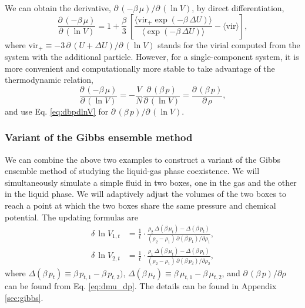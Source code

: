 \documentclass[reprint]{revtex4-1}
\begin{document}
We can obtain the derivative,
$\partial \, (-\beta \, \mu) / \partial \, (\ln V)$,
by direct differentiation,
%
\begin{equation*}
  \frac{ \partial \, (-\beta \, \mu) }
       { \partial \, (\ln V) }
  =
  1 +
  \frac{\beta } { 3 } \,
  \left[
    \frac{ \langle \mathrm{vir}_+ \exp(-\beta \, \Delta U) \rangle }
         { \langle \exp(-\beta \, \Delta U) \rangle }
    -
    \langle \mathrm{vir} \rangle
  \right]
  ,
\end{equation*}
%
where $\mathrm{vir}_+ \equiv -3 \, \partial \, (U + \Delta U) / \partial \, (\ln V)$
stands for the virial
computed from the system with the additional particle.
%
However, for a single-component system,
it is more convenient and computationally more stable
to take advantage of the thermodynamic relation,
\begin{equation}
  \frac{ \partial \, (-\beta \, \mu) }
       { \partial \, (\ln V) }
  =
  -\frac{V}{N}
  \frac{ \partial \, (\beta \, p) }
       { \partial \, (\ln V) }
  =
  \frac{ \partial \, (\beta \, p) }
       { \partial \, \rho }
  ,
  \label{eq:dmu_dp}
\end{equation}
%
and use Eq. \eqref{eq:dbpdlnV}
for $\partial \, (\beta\, p)/ \partial \, (\ln V)$.
%


\subsubsection{Variant of the Gibbs ensemble method}


We can combine the above two examples
to construct a variant of the Gibbs ensemble method\cite{
  panagiotopoulos1987, panagiotopoulos1988, frenkel}
of studying the liquid-gas phase coexistence.
%
We will simultaneously simulate a simple fluid
in two boxes, one in the gas and the other in the liquid phase.
%
We will adaptively adjust the volumes of the two boxes
to reach a point at which the two boxes share
the same pressure and chemical potential.
%
The updating formulas are
\begin{align}
  \delta \, \ln V_{1,t}
  &=
  \frac{1}{t} \cdot
  \frac{ \rho_2 \, \Delta( \beta \, \mu_t ) - \Delta( \beta \, p_t ) }
  { (\rho_2 - \rho_1) \, \partial (\beta \, p_1) / \partial \rho_1 }
  ,
  \label{eq:gibbs_p}
  \\
  \delta \, \ln V_{2,t}
  &=
  \frac{1}{t} \cdot
  \frac{ \rho_1 \, \Delta( \beta \, \mu_t ) - \Delta( \beta \, p_t ) }
  { (\rho_2 - \rho_1) \, \partial (\beta \, p_2) / \partial \rho_2 }
  ,
  \label{eq:gibbs_mu}
\end{align}
%
where
$\Delta( \beta \, p_t) \equiv \beta \, p_{t,1} - \beta \, p_{t,2})$,
$\Delta( \beta \, \mu_t) \equiv \beta \, \mu_{t,1} - \beta \, \mu_{t,2}$,
and
$\partial \, (\beta \, p) / \partial \rho$
can be found from Eq. \eqref{eq:dmu_dp}.
%
The details can be found in Appendix \ref{sec:gibbs}.
\end{document}
